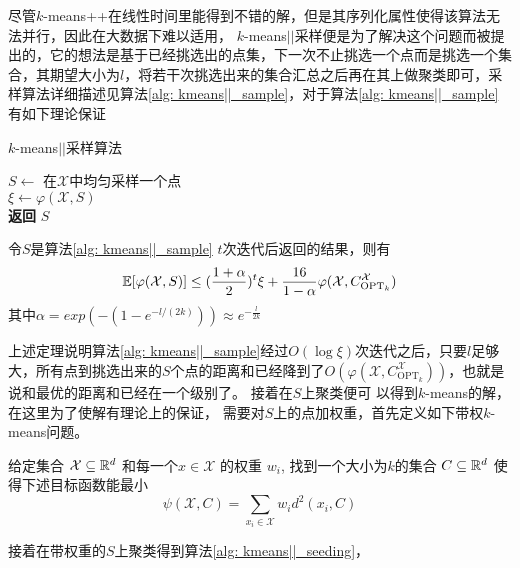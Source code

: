 尽管$k$-means++在线性时间里能得到不错的解，但是其序列化属性使得该算法无法并行，因此在大数据下难以适用， $k$-means\(\vert \vert\)采样便是为了解决这个问题而被提出的，它的想法是基于已经挑选出的点集，下一次不止挑选一个点而是挑选一个集合，其期望大小为$l$，将若干次挑选出来的集合汇总之后再在其上做聚类即可，采样算法详细描述见算法\ref{alg: kmeans||_sample}，对于算法\ref{alg: kmeans||_sample}有如下理论保证
\begin{algorithm}
    \caption{$k$-means\(\vert \vert\)采样算法}\label{alg: kmeans||_sample}
    $S \gets$ 在$\mathcal{X}$中均匀采样一个点 \\
    $\xi \gets \varphi(\mathcal{X},S)$ \\
    \textbf{返回} $S$
\end{algorithm}
\begin{theorem}
    \label{theo: kmeans||_performance_1}
    令$S$是算法\ref{alg: kmeans||_sample} $t$次迭代后返回的结果，则有
    \begin{equation*}
    \mathbb{E}[\varphi(\mathcal{X},S)] \leq (\frac{1+\alpha}{2})^t \xi + \frac{16}{1-\alpha}\varphi(\mathcal{X},C_{\text{OPT}_k}^{\mathcal{X}})
    \end{equation*}
    其中$\alpha=exp(-(1-e^{-l/(2k)})) \approx e^{-\frac{l}{2k}}$
\end{theorem}
上述定理说明算法\ref{alg: kmeans||_sample}经过$O(\log \xi)$次迭代之后，只要$l$足够大，所有点到挑选出来的$S$个点的距离和已经降到了$O(\varphi(\mathcal{X},C_{\text{OPT}_k}^\mathcal{X}))$，也就是说和最优的距离和已经在一个级别了。 接着在$S$上聚类便可
以得到$k$-means的解， 在这里为了使解有理论上的保证， 需要对$S$上的点加权重，首先定义如下带权$k$-means问题。
\begin{definition}[带权$k$-means问题]
    \label{def: weighted_kmeans}
    给定集合 $\mathcal{X} \subseteq \mathbb{R}^d$ 和每一个$x \in \mathcal{X}$ 的权重 $w_i$, 找到一个大小为$k$的集合 $C \subseteq \mathbb{R}^d$ 使得下述目标函数能最小
    \begin{equation*}
        \psi(\mathcal{X},C) = \sum_{x_i \in \mathcal{X}}w_i d^2 (x_i,C)
    \end{equation*}
\end{definition}
接着在带权重的$S$上聚类得到算法\ref{alg: kmeans||_seeding}，
